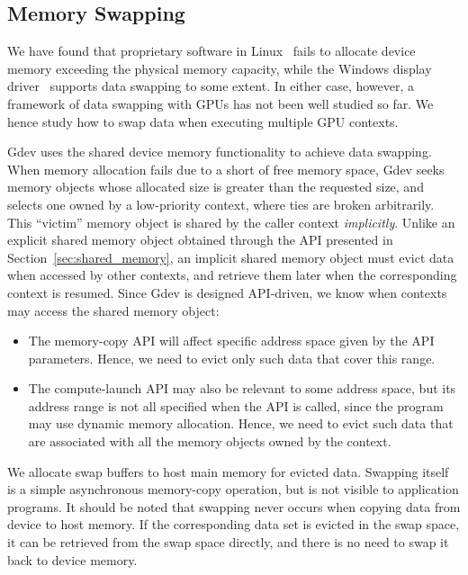 \vspace{-0.25em}
\subsection{Memory Swapping}
\label{sec:memory_swapping}
\vspace{-0.25em}

We have found that proprietary software in Linux~\cite{CUDA40} fails to
allocate device memory exceeding the physical memory capacity, while the
Windows display driver~\cite{Pronovost06} supports data swapping to 
some extent.
In either case, however, a framework of data swapping with GPUs has not
been well studied so far.
We hence study how to swap data when executing multiple GPU contexts.

Gdev uses the shared device memory functionality to achieve data
swapping.
When memory allocation fails due to a short of free memory
space, Gdev seeks memory objects whose allocated size is greater than
the requested size, and selects one owned by a low-priority context,
where ties are broken arbitrarily.
This ``victim'' memory object is shared by the caller context 
\textit{implicitly}.
Unlike an explicit shared memory object obtained through the API
presented in Section~\ref{sec:shared_memory}, an implicit shared memory
object must evict data when accessed by other contexts, and retrieve
them later when the corresponding context is resumed.
Since Gdev is designed API-driven, we know when contexts may access the
shared memory object:
\begin{itemize}
 \vspace{-0.25em}
 \item The memory-copy API will affect specific address space given by
       the API parameters.
       Hence, we need to evict only such data that cover this range.

 \vspace{-0.5em}
 \item The compute-launch API may also be relevant to some address
       space, but its address range is not all specified when the API is
       called, since the program may use dynamic memory allocation.
       Hence, we need to evict such data that are associated with all
       the memory objects owned by the context.
 \vspace{-0.25em}
\end{itemize}

We allocate swap buffers to host main memory for evicted data.
Swapping itself is a simple asynchronous memory-copy operation, but is
not visible to application programs.
It should be noted that swapping never occurs when copying data from
device to host memory.
If the corresponding data set is evicted in the swap space, it can be
retrieved from the swap space directly, and there is no need to swap it
back to device memory.

